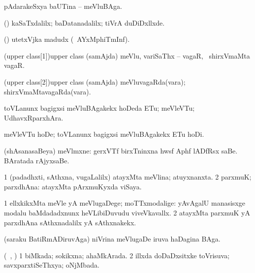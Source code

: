 {{\bentry
{} 
\gl{\nA}
\expl{}
\bmng
pAdarakeSxya baUTina -- meVluBAga. 
\emng

\noindent
\gl{\pagu}
\expl{}
\bmng
{} (\AmA) kaSaTxdalilx; baDatanadalilx; tiVrA duDiDxllxde. 
\emng
\eentry

\bentry
{} 
\gl{\nA}
\expl{}
\bmng
(\ashi) utetxVjka madudx (\kanmu\ AYxMphiTmInf). 
\emng
\eentry

\bentry
\word(upper class[1]){upper class} 
\pron{}
\gl{\nA}
\expl{}
\bmng
(samAjda) meVlu, variSaThx -- vagaR, \kanmu\ shirxVmaMta vagaR. 
\emng
\eentry

\bentry
\word(upper class[2]){upper class} 
\pron{}
\gl{\gu}
\expl{}
\bmng
(samAjda) meVluvagaRda(vara); shirxVmaMtavagaRda(vara). 
\emng
\eentry

\bentry
{} 
\gl{\nA}
\expl{}
\bmng
toVLanunx bagigxsi meVluBAgakekx hoDeda ETu; meVleVTu; UdhavxRparxhAra. 
\emng
\eentry

\bentry
{} 
\gl{\sakirx}
\expl{}
\bmng
meVleVTu hoDe; toVLanunx bagigxsi meVluBAgakekx ETu hoDi. 
\emng
\eentry

\bentry
{}
\gl{\nA}
\expl{}
\bmng
(shAsanasaBeya) meVlmxne: 
\banum
{} gerxVTf birxTninxna hwsf Aphf lADfRsx saBe. 
 BAratada rAjyxsaBe. 
\eanum
\emng
\eentry

\bentry
{} 
\gl{\gu}
\bmng
\bnum
\num{1} (padadhxti, sAthxna, \mo vugaLalilx) atayxMta meVlina; atuyxnanxta. 
\num{2} parxmuK; parxdhAna:  atayxMta pArxmuKyxda viSaya. 
\enum
\emng
\eentry

\bentry
{} 
\gl{\kirxvi}
\expl{}
\bmng
\bnum
\num{1} ellxkikxMta meVle yA meVlugaDege; moTTxmodalige:  yAvAgalU manasisxge modalu baMdadadxnunx heVLibiDuvudu viveVkavallx. 
\num{2} atayxMta parxmuK yA parxdhAna sAthxnadalilx yA sAthxnakekx. 
\enum
\emng
\eentry

\bentry
{}
\gl{\nA}
\expl{}
\bmng
(saraku BatiRmADiruvAga) niVrina meVlugaDe iruva haDagina BAga. 
\emng
\eentry

\bentry
{} 
\gl{\gu}
\expl{}
\bmng
(\kanmu\ \birx, \AmA) 
\bnum
\num{1} biMkada; sokikxna; ahaMkArada. 
\num{2} illxda doDaDxsitxke toVrisuva; savxparxtiSeThxya; oNjMbada. 
\enum
\emng
\eentry

}}
